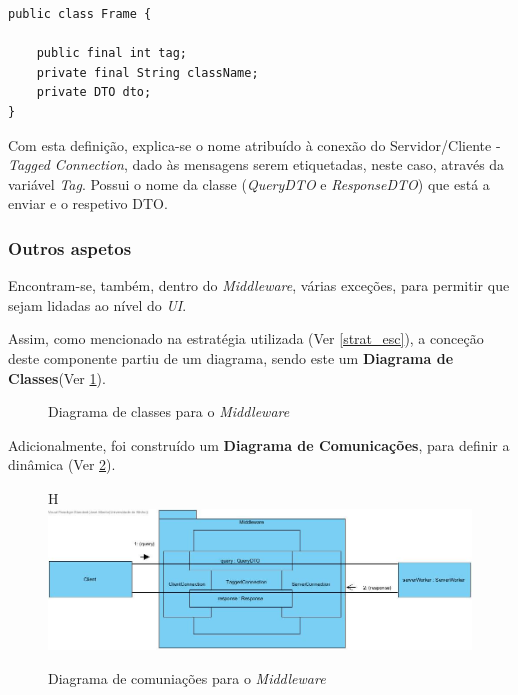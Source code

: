 \documentclass[relatorio.tex]{subfiles}
\begin{document}
\begin{verbatim}
public class Frame {

    public final int tag;
    private final String className;
    private DTO dto;
}
\end{verbatim}

Com esta definição, explica-se o nome atribuído à conexão do Servidor/Cliente - \textit{Tagged Connection}, dado às mensagens serem etiquetadas,
neste caso, através da variável \textit{Tag}.
Possui o nome da classe (\textit{QueryDTO} e \textit{ResponseDTO}) que está a enviar e o respetivo DTO.


\subsubsection{Outros aspetos}

Encontram-se, também, dentro do \textit{Middleware}, várias exceções, para permitir que sejam lidadas ao nível do \textit{UI}.

Assim, como mencionado na estratégia utilizada (Ver \ref{strat_esc}), a conceção deste componente partiu de um diagrama, 
sendo este um \textbf{Diagrama de Classes}(Ver \ref{dig:classes_middle}).

\begin{figure}[H] \label{dig:classes_middle}
    \caption{Diagrama de classes para o \textit{Middleware}}
\end{figure}

Adicionalmente, foi construído um \textbf{Diagrama de Comunicações}, para definir a dinâmica (Ver \ref{dig:comms_middle}).

\begin{figure}{H} \label{dig:comms_middle}
    \includegraphics{assets/diagrams/Middleware Communication Diagram.jpg}
    \caption{Diagrama de comuniações para o \textit{Middleware}}
\end{figure}
\end{document}
